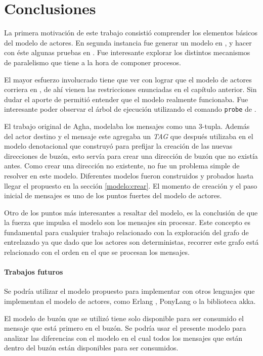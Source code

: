 \chapter{Conclusiones}

La primera motivación de este trabajo consistió comprender los elementos básicos del modelo de actores. En segunda instancia fue generar un modelo en \CSP, y hacer con éste algunas pruebas en \FDR. Fue interesante explorar los distintos mecanismos de paralelismo que tiene \CSP a la hora de componer procesos. 

El mayor esfuerzo involucrado tiene que ver con lograr que el modelo de actores corriera en \FDR, de ahí vienen las restricciones enunciadas en el capítulo anterior. Sin dudar el aporte de \FDR permitió entender que el modelo realmente funcionaba. Fue interesante poder observar el árbol de ejecución utilizando el comando \verb=probe= de \FDR. 

El trabajo original de Agha\cite{Agha:1986:AMC:7929}, modelaba los mensajes como una 3-tupla. Además del actor destino y el mensaje este agregaba un \textit{TAG} que después utilizaba en el modelo denotacional que construyó para prefijar la creación de las nuevas direcciones de buzón, esto servía para crear una dirección de buzón que no existía antes. Como crear una dirección no existente, no fue un problema simple de resolver en este modelo. Diferentes modelos fueron construidos y probados hasta llegar el propuesto en la sección \ref{modelo:crear}. El momento de creación y el paso inicial de mensajes es uno de los puntos fuertes del modelo de actores.

Otro de los puntos más interesantes a resaltar del modelo, es la conclusión de que la fuerza que impulsa el modelo son los mensajes sin procesar. Este concepto es fundamental para cualquier trabajo relacionado con la exploración del grafo de entrelazado ya que dado que los actores son deterministas, recorrer este grafo está relacionado con el orden en el que se procesan los mensajes.


\subsubsection*{Trabajos futuros}

Se podría utilizar el modelo propuesto para implementar con otros lenguajes que implementan el modelo de actores, como Erlang \cite{Armstrong:1996:CPE:229883, Cesarini:2009:EP:1717841}, PonyLang\cite{ponylang} o la biblioteca akka\cite{Wyatt:2013:AC:2663429}.

El modelo de buzón que se utilizó tiene solo disponible para ser consumido el mensaje que está primero en el buzón. Se podría usar el presente modelo para analizar las diferencias con el modelo en el cual todos los mensajes que están dentro del buzón están disponibles para ser consumidos.